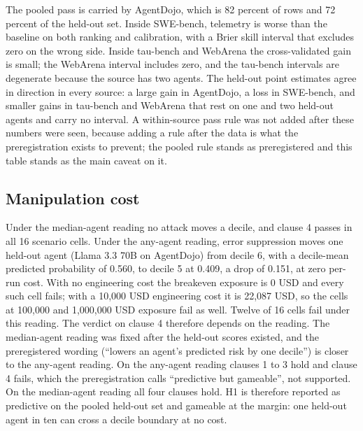 \documentclass[
  11pt,
  a4paper,
]{article}
\begin{document}
The pooled pass is carried by AgentDojo, which is 82 percent of rows and
72 percent of the held-out set. Inside SWE-bench, telemetry is worse
than the baseline on both ranking and calibration, with a Brier skill
interval that excludes zero on the wrong side. Inside tau-bench and
WebArena the cross-validated gain is small; the WebArena interval
includes zero, and the tau-bench intervals are degenerate because the
source has two agents. The held-out point estimates agree in direction
in every source: a large gain in AgentDojo, a loss in SWE-bench, and
smaller gains in tau-bench and WebArena that rest on one and two
held-out agents and carry no interval. A within-source pass rule was not
added after these numbers were seen, because adding a rule after the
data is what the preregistration exists to prevent; the pooled rule
stands as preregistered and this table stands as the main caveat on it.

\hypertarget{manipulation-cost-1}{%
\subsection{Manipulation cost}\label{manipulation-cost-1}}

Under the median-agent reading no attack moves a decile, and clause 4
passes in all 16 scenario cells. Under the any-agent reading, error
suppression moves one held-out agent (Llama 3.3 70B on AgentDojo) from
decile 6, with a decile-mean predicted probability of 0.560, to decile 5
at 0.409, a drop of 0.151, at zero per-run cost. With no engineering
cost the breakeven exposure is 0 USD and every such cell fails; with a
10,000 USD engineering cost it is 22,087 USD, so the cells at 100,000
and 1,000,000 USD exposure fail as well. Twelve of 16 cells fail under
this reading. The verdict on clause 4 therefore depends on the reading.
The median-agent reading was fixed after the held-out scores existed,
and the preregistered wording (``lowers an agent's predicted risk by one
decile'') is closer to the any-agent reading. On the any-agent reading
clauses 1 to 3 hold and clause 4 fails, which the preregistration calls
``predictive but gameable'', not supported. On the median-agent reading
all four clauses hold. H1 is therefore reported as predictive on the
pooled held-out set and gameable at the margin: one held-out agent in
ten can cross a decile boundary at no cost.
\end{document}
